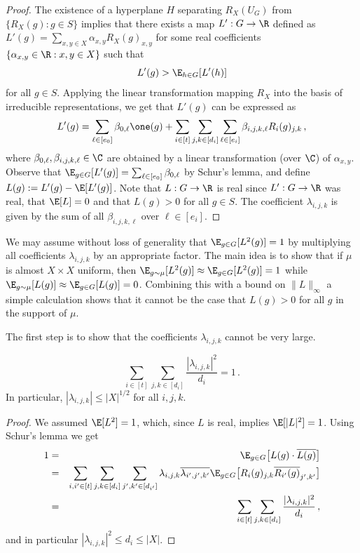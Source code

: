 \begin{proof}
The existence of a hyperplane $H$ separating $R_X(U_G)$ from
$\{R_X(g): g \in S\}$ implies that there exists a map $L':G \to \R$ defined as
$L'(g) = \sum_{x,y \in X} \alpha_{x,y} R_X(g)_{x,y}$
for some real coefficients $\{\alpha_{x,y} \in \R: x,y \in X\}$ such that
$$
L'(g) > \E_{h \in G}[L'(h)]
$$
for all $g \in S$. Applying the linear transformation mapping $R_X$
into the basis of irreducible representations, we get that $L'(g)$
can be expressed as
$$
L'(g) = \sum_{\ell \in [e_0]} \beta_{0,\ell} \one(g)
+ \sum_{i \in [t]} \sum_{j,k \in [d_i]} \sum_{\ell \in [e_i]}
\beta_{i,j,k,\ell} R_i(g)_{j,k}\,,
$$
where $\beta_{0,\ell},\beta_{i,j,k,\ell} \in \C$ are obtained by a linear
transformation (over $\C$) of $\alpha_{x,y}$. Observe that $\E_{g \in
G}[L'(g)] = \sum_{\ell \in [e_0]} \beta_{0,\ell}$ by Schur's lemma,
and define $L(g) := L'(g) - \E[L'(g)]$. Note that $L:G \to \R$ is real
since $L':G \to \R$ was real, that $\E[L]=0$ and that $L(g)>0$ for all
$g \in S$. The coefficient $\lambda_{i,j,k}$ is given by the sum of all
$\beta_{i,j,k,\ell}$ over $\ell \in [e_i]$.
\end{proof}

We may assume without loss of generality that $\E_{g \in G}[L^2(g)]=1$ by multiplying all
coefficients $\lambda_{i,j,k}$ by an appropriate factor. The main idea
is to show that if $\mu$ is almost $X \times X$ uniform, then $\E_{g
\sim \mu}[L^2(g)] \approx \E_{g \in G}[L^2(g)]=1$ while $\E_{g \sim
\mu}[L(g)] \approx \E_{g \in G}[L(g)]=0$. Combining this with a bound
on $\|L\|_{\infty}$ a simple calculation shows that it cannot be the
case that $L(g)>0$ for all $g$ in the support of $\mu$.

The first step is to show that the
coefficients $\lambda_{i,j,k}$ cannot be very large.

\begin{proposition}\label{prop:bound_coefficients_lambda}\hspace{1mm}
\[
\sum_{i \in [t]}\sum_{j,k \in [d_i]} \frac{|\lambda_{i,j,k}|^2}{d_i} = 1\,.
\]
In particular, $|\lambda_{i,j,k}| \le |X|^{1/2}$ for all $i,j,k$.
\end{proposition}

\begin{proof}
We assumed $\E[L^2]=1$, which, since $L$ is
real, implies $\E[|L|^2]=1$. Using Schur's lemma we get
\begin{eqnarray*}
1 &=& \E_{g \in G}\bigl[L(g) \cdot \overline{L(g)}\bigr] \\
&=& \sum_{i,i' \in [t]} \sum_{j,k \in [d_i]} \sum_{j',k' \in [d_{i'}]}
\lambda_{i,j,k} \overline{\lambda_{i',j',k'}} \E_{g \in G}\bigl[R_i(g)_{j,k}
\overline{R_{i'}(g)}_{j',k'}\bigr]\\
& =& \sum_{i \in [t]} \sum_{j,k \in [d_i]} \frac{|\lambda_{i,j,k}|^2}{d_i}\,,
\end{eqnarray*}
and in particular $|\lambda_{i,j,k}|^2 \le d_i \le |X|$.
\end{proof}

